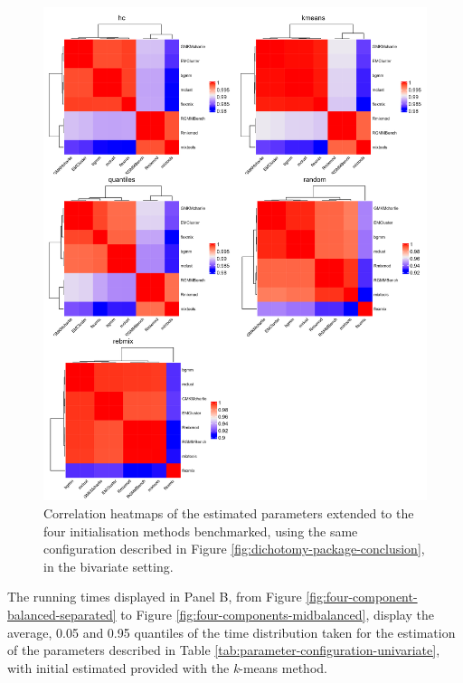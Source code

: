 \newpage
\begin{figure}

{\centering \includegraphics[width=1\linewidth]{./figs/univariate/heatmap_univariate} 

}

\caption{Correlation heatmaps of the estimated parameters extended to the four initialisation methods benchmarked, using the same configuration described in Figure \ref{fig:dichotomy-package-conclusion}, in the bivariate setting.}\label{fig:heatmap-all-correlation-plots-univariate}
\end{figure}

The running times displayed in Panel B, from Figure
\ref{fig:four-component-balanced-separated} to Figure
\ref{fig:four-components-midbalanced}, display the average, 0.05 and 0.95 quantiles of the time distribution
taken for the estimation of the parameters described in Table
\ref{tab:parameter-configuration-univariate}, with initial
estimated provided with the \emph{k}-means method.

